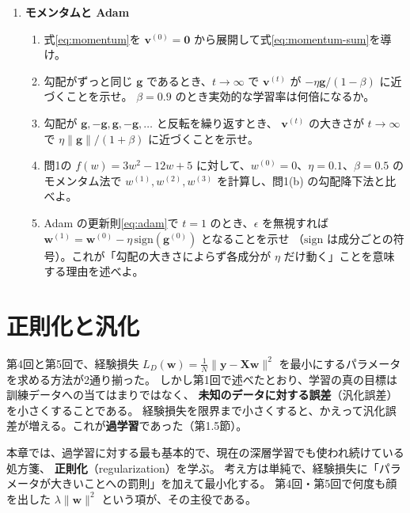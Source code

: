 \begin{enumerate}
  \item \textbf{モメンタムと Adam}\quad
    \begin{enumerate}
      \item 式\eqref{eq:momentum}を $\bm{v}^{(0)} = \bm{0}$ から展開して式\eqref{eq:momentum-sum}を導け。
      \item 勾配がずっと同じ $\bm{g}$ であるとき、$t \to \infty$ で $\bm{v}^{(t)}$ が $-\eta\bm{g}/(1 - \beta)$ に近づくことを示せ。
        $\beta = 0.9$ のとき実効的な学習率は何倍になるか。
      \item 勾配が $\bm{g}, -\bm{g}, \bm{g}, -\bm{g}, \ldots$ と反転を繰り返すとき、
        $\bm{v}^{(t)}$ の大きさが $t \to \infty$ で $\eta\|\bm{g}\|/(1 + \beta)$ に近づくことを示せ。
      \item 問1の $f(w) = 3w^2 - 12w + 5$ に対して、$w^{(0)} = 0$、$\eta = 0.1$、$\beta = 0.5$ の
        モメンタム法で $w^{(1)}, w^{(2)}, w^{(3)}$ を計算し、問1(b) の勾配降下法と比べよ。
      \item Adam の更新則\eqref{eq:adam}で $t = 1$ のとき、$\epsilon$ を無視すれば
        $\bm{w}^{(1)} = \bm{w}^{(0)} - \eta\,\mathrm{sign}(\bm{g}^{(0)})$ となることを示せ
        （$\mathrm{sign}$ は成分ごとの符号）。これが「勾配の大きさによらず各成分が $\eta$ だけ動く」ことを意味する理由を述べよ。
    \end{enumerate}

\end{enumerate}


\clearpage
\section{正則化と汎化}

第4回と第5回で、経験損失 $L_D(\bm{w}) = \frac{1}{N}\|\bm{y} - \bm{X}\bm{w}\|^2$ を最小にするパラメータを求める方法が2通り揃った。
しかし第1回で述べたとおり、学習の真の目標は訓練データへの当てはまりではなく、
\textbf{未知のデータに対する誤差}（汎化誤差）を小さくすることである。
経験損失を限界まで小さくすると、かえって汎化誤差が増える。これが\textbf{過学習}であった（第1.5節）。

本章では、過学習に対する最も基本的で、現在の深層学習でも使われ続けている処方箋、
\textbf{正則化}（regularization）を学ぶ。
考え方は単純で、経験損失に「パラメータが大きいことへの罰則」を加えて最小化する。
第4回・第5回で何度も顔を出した $\lambda\|\bm{w}\|^2$ という項が、その主役である。

